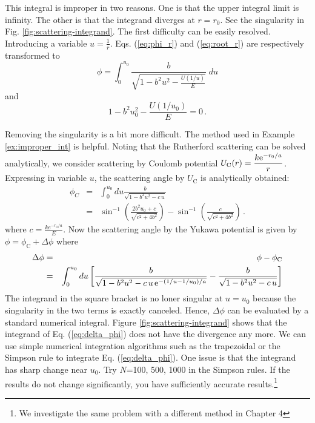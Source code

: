 This integral is improper in two reasons.  One is that the upper integral limit is infinity. The other is that 
the integrand diverges at $r=r_0$.  See the singularity in Fig. \ref{fig:scattering-integrand}. 
The first difficulty can be easily resolved.  Introducing a variable $u = \displaystyle\frac{1}{r}$.
Eqs. (\ref{eq:phi_r}) and (\ref{eq:root_r}) are respectively transformed to
\begin{equation}
\phi = \int_0^{u_0} \frac{b}{\sqrt{1-b^2 u^2 -\displaystyle\frac{U(1/u)}{E}}}\;  du
\label{eq:phi_u}
\end{equation}
and
\begin{equation}
1-b^2 u_0^2 -\frac{U(1/u_0)}{E} = 0\,.
\label{eq:root_u}
\end{equation}

Removing the singularity is a bit more difficult. The method used in Example \ref{ex:improper_int} is helpful.  Noting that the Rutherford scattering can be solved analytically, we consider scattering by Coulomb potential $U_\text{C}(r) = \displaystyle\frac{k \text{e}^{-r_0/a}}{r}$.  Expressing in variable $u$, the scattering angle by $U_\text{C}$ is analytically obtained:
\begin{eqnarray}
\phi_C &=& \int_0^{u_0} du \frac{b}{\sqrt{1-b^2 u^2 -c\, u}} \\
&=&\sin^{-1}\left(\frac{2b^2u_0+c}{\sqrt{c^2+4b^2}}\right)
-\sin^{-1}\left(\frac{c}{\sqrt{c^2+4b^2}}\right)\, .
\end{eqnarray}
where $c=\displaystyle\frac{k e^{-r_0/a}}{E}$.
Now the scattering angle by the Yukawa potential is given by $\phi= \phi_\text{C} + \Delta \phi$ where 
%
\begin{eqnarray}
\Delta \phi &=& \phi - \phi_\text{C} \\
&=& \int_0^{u_0} du \left [ \frac{b}{\sqrt{1-b^2 u^2 -c\, u\, \text{e}^{-(1/u-1/u_0)/a}}}
- \frac{b}{\sqrt{1-b^2 u^2 -c\, u}}\right ]
\label{eq:delta_phi}
\end{eqnarray}
%
The integrand in the square bracket is no loner singular at $u=u_0$ because the singularity in the two terms is exactly canceled. Hence, $\Delta \phi$ can be evaluated by a standard numerical integral.  Figure \ref{fig:scattering-integrand} shows that the integrand of Eq. (\ref{eq:delta_phi}) does not have the divergence any more.
We can use simple numerical integration algorithms such as the trapezoidal or the
Simpson rule to integrate Eq. (\ref{eq:delta_phi}).  One issue is that the integrand has sharp change near $u_0$.
Try $N$=100, 500, 1000 in the Simpson rules.  If the results do not change significantly, you have
sufficiently accurate results.\footnote{We investigate the same problem with a different method in Chapter 4}


